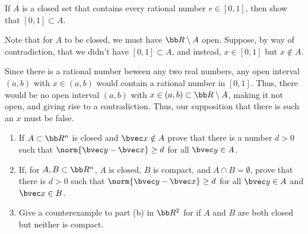 \documentclass[12pt, letterpaper]{hmcpset}
\begin{document}
\pagebreak

\begin{problem}[19]
	If $A$ is a closed set that contains every rational number $r \in [0, 1]$, then show that $[0, 1] \subset A$.
\end{problem}

\begin{solution}
	Note that for $A$ to be closed, we must have $\bb R \setminus A$ open. Suppose, by way of contradiction, that we didn't have $[0, 1] \subset A$, and instead, $x \in [0, 1]$ but $x \notin A$. 

	Since there is a rational number beween any two real numbers, any open interval $(a, b)$ with $x \in (a, b)$ would contain a rational number in $[0, 1]$. Thus, there would be no open interval $(a, b)$ with $x \in (a, b) \subset \bb R \setminus A$, making it not open, and giving rise to a contradiction. Thus, our supposition that there is such an $x$ must be false.
\end{solution}

\pagebreak

\begin{problem}[21]
	\begin{enumerate}
		\item If $A \subset \bb R^n$ is closed and $\bvec x \notin A$ prove that there is a number $d > 0$ such that $\norm{\bvec y - \bvec x} \ge d$ for all $\bvec y \in A$.
		\item If, for $A, B \subset \bb R^n$, $A$ is closed, $B$ is compact, and $A \cap B = \emptyset$, prove that there is $d > 0$ such that $\norm{\bvec y - \bvec x} \ge d$ for all $\bvec y \in A$ and $\bvec x \in B$.
		\item Give a counterexample to part (b) in $\bb R^2$ for if $A$ and $B$ are both closed but neither is compact.
	\end{enumerate}
\end{problem}
\end{document}
